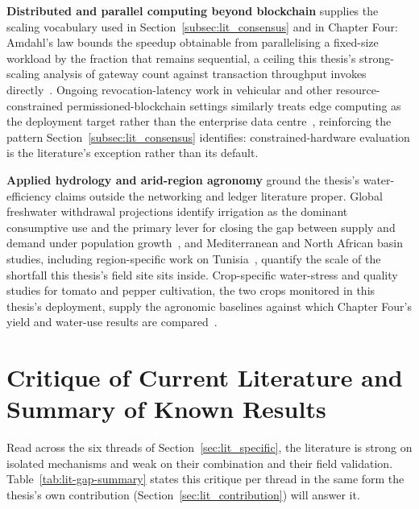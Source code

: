 \documentclass[12pt,a4paper,oneside]{book}
\begin{document}
\textbf{Distributed and parallel computing beyond blockchain} supplies the
scaling vocabulary used in Section~\ref{subsec:lit_consensus} and in
Chapter Four: Amdahl's law bounds the speedup obtainable from
parallelising a fixed-size workload by the fraction that remains
sequential, a ceiling this thesis's strong-scaling analysis of gateway
count against transaction throughput invokes
directly~\cite{amdahl1967validity}. Ongoing revocation-latency work in
vehicular and other resource-constrained permissioned-blockchain settings
similarly treats edge computing as the deployment target rather than the
enterprise data centre~\cite{lu2022revocation}, reinforcing the pattern
Section~\ref{subsec:lit_consensus} identifies: constrained-hardware
evaluation is the literature's exception rather than its default.

\textbf{Applied hydrology and arid-region agronomy} ground the thesis's
water-efficiency claims outside the networking and ledger literature
proper. Global freshwater withdrawal projections identify irrigation as
the dominant consumptive use and the primary lever for closing the gap
between supply and demand under
population growth~\cite{fao2050, un_water2023}, and Mediterranean and North
African basin studies, including region-specific work on
Tunisia~\cite{tunisia_water_report, adeloye2021tunisiaAgro,
benali2024tunisiaWater, shanhong2021water}, quantify the scale of the
shortfall this thesis's field site sits inside. Crop-specific water-stress
and quality studies for tomato and pepper cultivation, the two crops
monitored in this thesis's deployment, supply the agronomic baselines
against which Chapter Four's yield and water-use results are
compared~\cite{mdpi_tunisia_tomato, jaeid_pepper, fao_tomato_guide,
safeer2024tomato, wang2025pepper, tia2020waterstress,
pepper2021moisturecontrol, capsicumspacing2017study, precision2020yield,
pepperquality2019irrigation}.

\section{Critique of Current Literature and Summary of Known Results}
\label{sec:lit_critique}

Read across the six threads of Section~\ref{sec:lit_specific}, the
literature is strong on isolated mechanisms and weak on their combination
and their field validation. Table~\ref{tab:lit-gap-summary} states this
critique per thread in the same form the thesis's own contribution
(Section~\ref{sec:lit_contribution}) will answer it.
\end{document}
